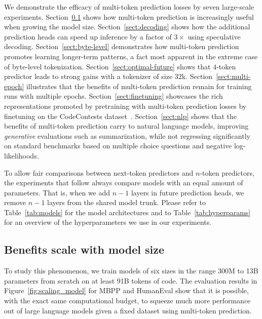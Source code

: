 \label{sect:results}

We demonstrate the efficacy of multi-token prediction losses by seven large-scale experiments.
Section~\ref{sect:model-scaling} shows how multi-token prediction is increasingly useful when growing the model size.
Section~\ref{sect:decoding} shows how the additional prediction heads can speed up inference by a factor of \textbf{$3\times$} using speculative decoding. 
Section~\ref{sect:byte-level} demonstrates how multi-token prediction promotes learning longer-term patterns, a fact most apparent in the extreme case of byte-level tokenization.
Section~\ref{sect:optimal-future} shows that $4$-token predictor leads to strong gains with a tokenizer of size $32$k.
Section~\ref{sect:multi-epoch} illustrates that the benefits of multi-token prediction remain for training runs with multiple epochs. 
Section~\ref{sect:finetuning} showcases the rich representations promoted by pretraining with multi-token prediction losses by finetuning on the CodeContests dataset~\citep{li2022competition}.
Section~\ref{sect:nlp} shows that the benefits of multi-token prediction carry to natural language models, improving \emph{generative} evaluations such as summarization, while not regressing significantly on standard benchmarks based on multiple choice questions and negative log-likelihoods. 

To allow fair comparisons between next-token predictors and $n$-token predictors, the experiments that follow always compare models with an equal amount of parameters.
That is, when we add $n-1$ layers in future prediction heads, we remove $n-1$ layers from the shared model trunk.
Please refer to Table~\ref{tab:models} for the model architectures and to Table~\ref{tab:hyperparams} for an overview of the hyperparameters we use in our experiments.




\subsection{Benefits scale with model size}
\label{sect:model-scaling}
To study this phenomenon, we train models of six sizes in the range 300M to 13B parameters from scratch on at least 91B tokens of code.
The evaluation results in Figure~\ref{fig:scaling_model} for MBPP \citep{austin2021program} and HumanEval \citep{chen2021evaluating} show that it is possible, with the exact same computational budget, to squeeze much more performance out of large language models given a fixed dataset using multi-token prediction. 

